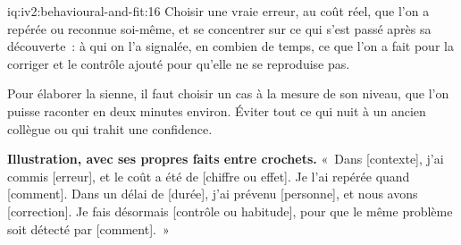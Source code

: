 \begin{solution}{iq:iv2:behavioural-and-fit:16}
Choisir une vraie erreur, au coût réel, que l'on a repérée ou reconnue soi-même, et se concentrer sur ce qui s'est passé après sa découverte~: à qui on l'a signalée, en combien de temps, ce que l'on a fait pour la corriger et le contrôle ajouté pour qu'elle ne se reproduise pas.

Pour élaborer la sienne, il faut choisir un cas à la mesure de son niveau, que l'on puisse raconter en deux minutes environ. Éviter tout ce qui nuit à un ancien collègue ou qui trahit une confidence.

\textbf{Illustration, avec ses propres faits entre crochets.} «~Dans [contexte], j'ai commis [erreur], et le coût a été de [chiffre ou effet]. Je l'ai repérée quand [comment]. Dans un délai de [durée], j'ai prévenu [personne], et nous avons [correction]. Je fais désormais [contrôle ou habitude], pour que le même problème soit détecté par [comment].~»

\end{solution}

